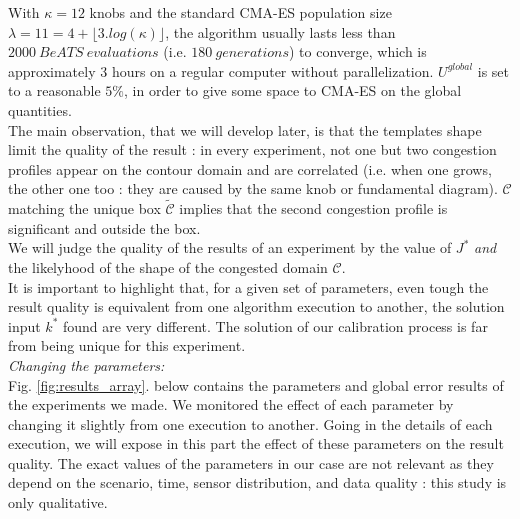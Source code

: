 
With $\kappa=12$ knobs and the standard CMA-ES population size $\lambda=11=4+\lfloor3.log(\kappa)\rfloor$, the algorithm usually lasts less than $2000\ BeATS\ evaluations$ (i.e. $180\ generations$) to converge, which is  approximately 3 hours on a regular computer without parallelization.
$U^{global}$ is set to a reasonable $5\%$, in order to give some space to CMA-ES on the global quantities.\\
The main observation, that we will develop later, is that the templates shape limit the quality of the result : in every experiment, not one but two congestion profiles appear on the contour domain and are correlated (i.e. when one grows, the other one too : they are caused by the same knob or fundamental diagram).  $\mathscr{C}$ matching the unique box $\widetilde{\mathscr{C}}$ implies that the second congestion profile is significant and outside the box.\\
We will judge the quality of the results of an experiment by the value of $J^{*}$ \emph{and} the likelyhood of the shape of the congested domain $\mathscr{C}$. \\
It is important to highlight that, for a given set of parameters, even tough the result quality is equivalent from one algorithm execution to another, the solution input $k^{*}$ found are very different. The solution of our calibration process is far from being unique for this experiment.\\
\emph{Changing the parameters:}\\
Fig. \ref{fig:results_array}. below contains the parameters and global error results of the experiments we made. We monitored the effect of each parameter by changing it slightly from one execution to another. Going in the details of each execution, we will expose in this part the effect of these parameters on the result quality. The exact values of the parameters in our case are not relevant as they depend on the scenario, time, sensor distribution, and data quality : this study is only qualitative.

